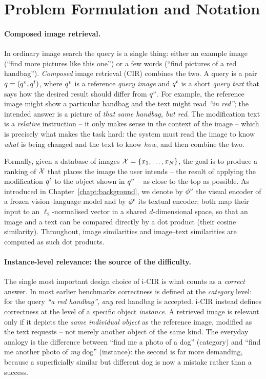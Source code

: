 \section{Problem Formulation and Notation}\label{sect:method_problem}

\paragraph{Composed image retrieval.}
In ordinary image search the query is a single thing: either an example image
(``find more pictures like this one'') or a few words (``find pictures of a red
handbag''). \emph{Composed} image retrieval (CIR) combines the two. A query is a
pair $q = (q^{v}, q^{t})$, where $q^{v}$ is a reference \emph{query image} and $q^{t}$ is
a short \emph{query text} that says how the desired result should differ from
$q^{v}$. For example, the reference image might show a particular handbag and the
text might read \emph{``in red''}; the intended answer is a picture of \emph{that
same handbag, but red}. The modification text is a \emph{relative} instruction --
it only makes sense in the context of the image -- which is precisely what makes
the task hard: the system must read the image to know \emph{what} is being
changed and the text to know \emph{how}, and then combine the two.

Formally, given a database of images $\mathcal{X} = \{x_1, \dots, x_N\}$, the goal
is to produce a ranking of $\mathcal{X}$ that places the image the user intends -- the
result of applying the modification $q^{t}$ to the object shown in $q^{v}$ -- as
close to the top as possible. As introduced in Chapter~\ref{chapt:background},
we denote by $\phi^{v}$ the visual encoder of a frozen vision--language model and by
$\phi^{t}$ its textual encoder; both map their input to an $\ell_2$-normalised
vector in a shared $d$-dimensional space, so that an image and a text can be
compared directly by a dot product (their cosine similarity). Throughout, image
similarities and image--text similarities are computed as such dot products.

\paragraph{Instance-level relevance: the source of the difficulty.}
The single most important design choice of i-CIR is what counts as a \emph{correct}
answer. In most earlier benchmarks correctness is defined at the \emph{category}
level: for the query \emph{``a red handbag''}, \emph{any} red handbag is accepted.
i-CIR instead defines correctness at the level of a specific object
\emph{instance}. A retrieved image is relevant only if it depicts the \emph{same
individual object} as the reference image, modified as the text requests -- not
merely another object of the same kind. The everyday analogy is the difference
between ``find me a photo of a dog'' (category) and ``find me another photo of
\emph{my} dog'' (instance): the second is far more demanding, because a
superficially similar but different dog is now a mistake rather than a success.

